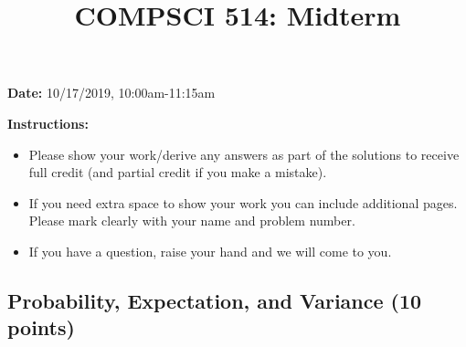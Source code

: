\documentclass[11pt]{article}
\title{COMPSCI 514: Midterm}
\date{}
\begin{document}
\maketitle

\vspace{-3em}
\textbf{Date:} 10/17/2019, 10:00am-11:15am 

\medskip 

\textbf{Instructions:}
\begin{itemize}
\item Please show your work/derive any answers as part of the solutions to receive full credit (and partial credit if you make a mistake).
\item If you need extra space to show your work you can include additional pages. Please mark clearly with your name and problem number.
\item If you have a question, raise your hand and we will come to you.
\end{itemize}

\smallskip

\subsection*{Probability, Expectation, and Variance \normalfont (10 points)} 
\end{document}
